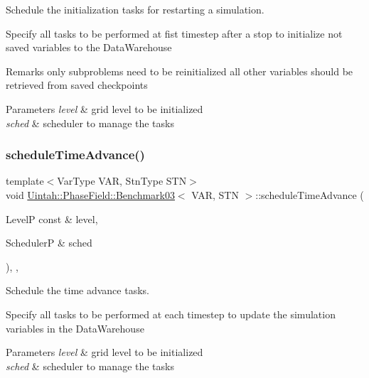 Schedule the initialization tasks for restarting a simulation. 

Specify all tasks to be performed at fist timestep after a stop to initialize not saved variables to the Data\+Warehouse

\begin{DoxyRemark}{Remarks}
only subproblems need to be reinitialized all other variables should be retrieved from saved checkpoints
\end{DoxyRemark}

\begin{DoxyParams}{Parameters}
{\em level} & grid level to be initialized \\
\hline
{\em sched} & scheduler to manage the tasks \\
\hline
\end{DoxyParams}
\mbox{\label{classUintah_1_1PhaseField_1_1Benchmark03_aa2b5eeaf8726e56e512095e15612783e}} 
\subsubsection{\texorpdfstring{schedule\+Time\+Advance()}{scheduleTimeAdvance()}}
{\footnotesize\ttfamily template$<$Var\+Type V\+AR, Stn\+Type S\+TN$>$ \\
void \hyperlink{classUintah_1_1PhaseField_1_1Benchmark03}{Uintah\+::\+Phase\+Field\+::\+Benchmark03}$<$ V\+AR, S\+TN $>$\+::schedule\+Time\+Advance (\begin{DoxyParamCaption}\item[{LevelP const \&}]{level,  }\item[{SchedulerP \&}]{sched }\end{DoxyParamCaption})\hspace{0.3cm}{\ttfamily [override]}, {\ttfamily [protected]}, {\ttfamily [virtual]}}



Schedule the time advance tasks. 

Specify all tasks to be performed at each timestep to update the simulation variables in the Data\+Warehouse


\begin{DoxyParams}{Parameters}
{\em level} & grid level to be initialized \\
\hline
{\em sched} & scheduler to manage the tasks \\
\hline
\end{DoxyParams}
\mbox{\label{classUintah_1_1PhaseField_1_1Benchmark03_a6e782ef567230e917ad9afe2b5e677eb}} 
